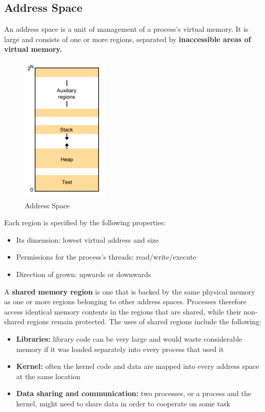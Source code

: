 \subsection{Address Space}
An address space is a unit of management of a process’s virtual memory. It is large and consists of one or more regions, separated by \textbf{inaccessible areas of virtual memory.}

\begin{figure}[!h]
    \centering
    \includegraphics[width=.2\linewidth]{images/OperatingSystemSupport/addressSpace.png}
    \caption{Address Space}
\end{figure}

Each region is specified by the following properties:
\begin{itemize}
    \item Its dimension: lowest virtual address and size
    \item Permissions for the process’s threads: read/write/execute
    \item Direction of  grown: upwards or downwards
\end{itemize}
A \textbf{shared memory region} is one that is backed by the same physical memory as one or more regions belonging to other address spaces.
Processes therefore access identical memory contents in the regions that are shared, while their non-shared regions remain protected.
The uses of shared regions include the following:
\begin{itemize}
    \item \textbf{Libraries:} library code can be very large and would waste considerable memory if it was loaded separately into every process that used it
    \item \textbf{Kernel:} often the kernel code and data are mapped into every address space at the same location
    \item \textbf{Data sharing and communication:} two processes, or a process and the kernel, might need to share data in order to cooperate on some task
\end{itemize}

